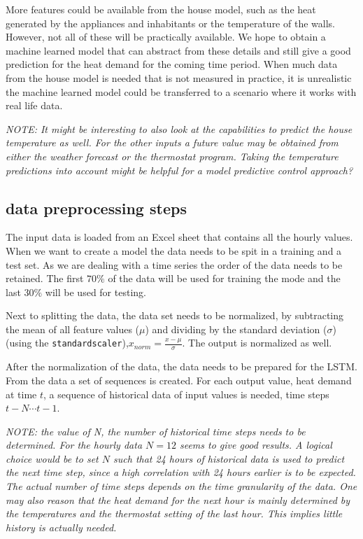 More features could be available from the house model, such as the heat generated by the appliances and inhabitants or the temperature of the walls. However, not all of these will be practically available. We hope to obtain a machine learned model that can abstract from these details and still give a good prediction for the heat demand for the coming time period. When much data from the house model is needed that is not measured in practice, it is unrealistic the machine learned model could be transferred to a scenario where it works with real life data.  

\textit{NOTE: It might be interesting to also look at the capabilities to predict the house temperature as well. For the other inputs a future value may be obtained from either the weather forecast or the thermostat program. Taking the temperature predictions into account might be helpful for a model predictive control approach?}

\subsection{data preprocessing steps}
The input data is loaded from an Excel sheet that contains all the hourly values. When we want to create a model the data needs to be spit in a training and a test set. As we are dealing with a time series the order of the data needs to be retained. The first $70\%$ of the data will be used for training the mode and the last $30\%$ will be used for testing. 

Next to splitting the data, the data set needs to be normalized, by subtracting the mean of all feature values ($\mu$) and dividing by the standard deviation ($\sigma$) (using the \texttt{standardscaler}),$x_{norm}= \frac{x-\mu}{\sigma}$. The output is normalized as well.

After the normalization of the data, the data needs to be prepared for the LSTM. From the data a set of sequences is created. For each output value, heat demand at time $t$, a sequence of historical data of input values is needed, time steps $t-N \cdots t-1$.  

\textit{NOTE: the value of N, the number of historical time steps needs to be determined. For the hourly data $N=12$ seems to give good results. A logical choice would be to set $N$ such that 24 hours of historical data is used to predict the next time step, since a high correlation with 24 hours earlier is to be expected. The actual number of time steps depends on the time granularity of the data. 
One may also reason that the heat demand for the next hour is mainly determined by the temperatures and the thermostat setting of the last hour. This implies little history is actually needed.} 

